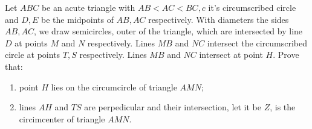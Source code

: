 Let $ABC$ be an acute triangle with $AB<AC<BC, c$  it's circumscribed circle  and $D,E$ be the midpoints of $AB,AC$ respectively. With diameters the sides $AB,AC$, we draw semicircles, outer of the triangle, which are intersected by line $D$ at points $M$ and $N$ respectively. Lines $MB$ and $NC$ intersect the circumscribed circle at points $T,S$ respectively. Lines $MB$ and $NC$ intersect at point $H$. Prove that:

\begin{enumerate}[label = (\alph*)]
	\item point $H$ lies on the circumcircle of triangle $AMN$;
	\item lines $AH$ and $TS$ are perpedicular and their intersection, let it be $Z$, is the circimcenter of triangle $AMN$.
\end{enumerate}

